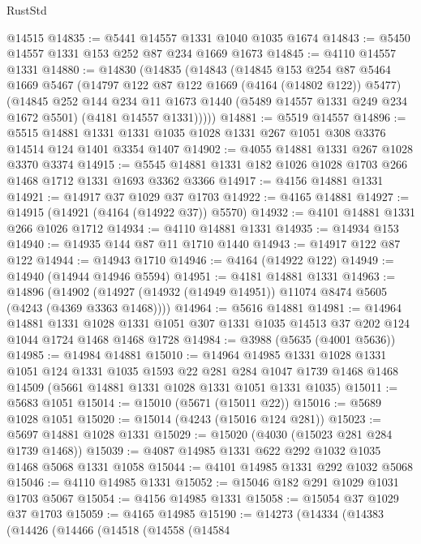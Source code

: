 \begin{lexlean}{RustStd}
\begin{coremodule}
    @14515
@14835 := @5441 @14557 @1331 @1040 @1035 @1674
@14843 := @5450 @14557 @1331 @153 @252 @87 @234 @1669 @1673
@14845 := @4110 @14557 @1331
@14880 := @14830
    (@14835
      (@14843
        (@14845
          @153
          @254
          @87
          @5464
          @1669
          @5467
          (@14797 @122 @87 @122 @1669 (@4164 (@14802 @122)) @5477)
          (@14845
            @252
            @144
            @234
            @11
            @1673
            @1440
            (@5489 @14557 @1331 @249 @234 @1672 @5501)
            (@4181 @14557 @1331)))))
@14881 := @5519 @14557
@14896 := @5515
    @14881
    @1331
    @1331
    @1035
    @1028
    @1331
    @267
    @1051
    @308
    @3376
    @14514
    @124
    @1401
    @3354
    @1407
@14902 := @4055 @14881 @1331 @267 @1028 @3370 @3374
@14915 := @5545 @14881 @1331 @182 @1026 @1028 @1703 @266 @1468 @1712 @1331 @1693 @3362 @3366
@14917 := @4156 @14881 @1331
@14921 := @14917 @37 @1029 @37 @1703
@14922 := @4165 @14881
@14927 := @14915 (@14921 (@4164 (@14922 @37)) @5570)
@14932 := @4101 @14881 @1331 @266 @1026 @1712
@14934 := @4110 @14881 @1331
@14935 := @14934 @153
@14940 := @14935 @144 @87 @11 @1710 @1440
@14943 := @14917 @122 @87 @122
@14944 := @14943 @1710
@14946 := @4164 (@14922 @122)
@14949 := @14940 (@14944 @14946 @5594)
@14951 := @4181 @14881 @1331
@14963 := @14896
    (@14902 (@14927 (@14932 (@14949 @14951)) @11074 @8474 @5605 (@4243 (@4369 @3363 @1468))))
@14964 := @5616 @14881
@14981 := @14964
    @14881
    @1331
    @1028
    @1331
    @1051
    @307
    @1331
    @1035
    @14513
    @37
    @202
    @124
    @1044
    @1724
    @1468
    @1468
    @1728
@14984 := @3988 (@5635 (@4001 @5636))
@14985 := @14984 @14881
@15010 := @14964
    @14985
    @1331
    @1028
    @1331
    @1051
    @124
    @1331
    @1035
    @1593
    @22
    @281
    @284
    @1047
    @1739
    @1468
    @1468
    @14509
    (@5661 @14881 @1331 @1028 @1331 @1051 @1331 @1035)
@15011 := @5683 @1051
@15014 := @15010 (@5671 (@15011 @22))
@15016 := @5689 @1028 @1051
@15020 := @15014 (@4243 (@15016 @124 @281))
@15023 := @5697 @14881 @1028 @1331
@15029 := @15020 (@4030 (@15023 @281 @284 @1739 @1468))
@15039 := @4087 @14985 @1331 @622 @292 @1032 @1035 @1468 @5068 @1331 @1058
@15044 := @4101 @14985 @1331 @292 @1032 @5068
@15046 := @4110 @14985 @1331
@15052 := @15046 @182 @291 @1029 @1031 @1703 @5067
@15054 := @4156 @14985 @1331
@15058 := @15054 @37 @1029 @37 @1703
@15059 := @4165 @14985
@15190 := @14273
    (@14334
      (@14383
        (@14426
          (@14466
            (@14518
              (@14558
                (@14584

\end{coremodule}
\end{lexlean}
